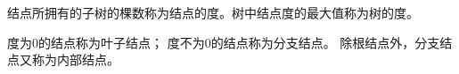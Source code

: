 \begin{frame}\ft{\subsecname}
\begin{dingyi}
结点所拥有的子树的棵数称为结点的度。树中结点度的最大值称为树的度。
\end{dingyi}
\pause 

\begin{figure}
\centering

\end{figure}


\end{frame}

\begin{frame}\ft{\subsecname}
\begin{dingyi}
度为0的结点称为\textcolor{acolor5}{叶子结点}；
度不为0的结点称为\textcolor{acolor5}{分支结点}。
除根结点外，分支结点又称为内部结点。
\end{dingyi}
\pause 

\begin{figure}
\centering

\end{figure}


\end{frame}



